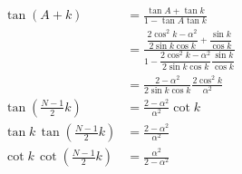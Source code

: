 \documentclass[../../../main.tex]{subfiles}
\begin{document}
\begin{align*}
  \tan(A+k)                                & = \frac{\tan A+\tan k} {1-\tan A\tan k}                                                                                                           \\
                                           & = \frac{ \dfrac{2\cos^2k-\alpha^2}{2\sin k\cos k} +\dfrac{\sin k}{\cos k} }{ 1- \dfrac{2\cos^2k-\alpha^2}{2\sin k\cos k} \dfrac{\sin k}{\cos k} } \\
                                           & = \frac{2-\alpha^2}{2\sin k\cos k} \frac{2\cos^2k}{\alpha^2}                                                                                      \\
  \tan\left(\frac{N-1}{2}k\right)          & =  \frac{2-\alpha^2}{\alpha^2}\cot k                                                                                                              \\
  \tan k\, \tan\left(\frac{N-1}{2}k\right) & =  \frac{2-\alpha^2}{\alpha^2}                                                                                                                    \\
  \cot k\, \cot\left(\frac{N-1}{2}k\right) & =  \frac{\alpha^2}{2-\alpha^2}
\end{align*}
\end{document}
